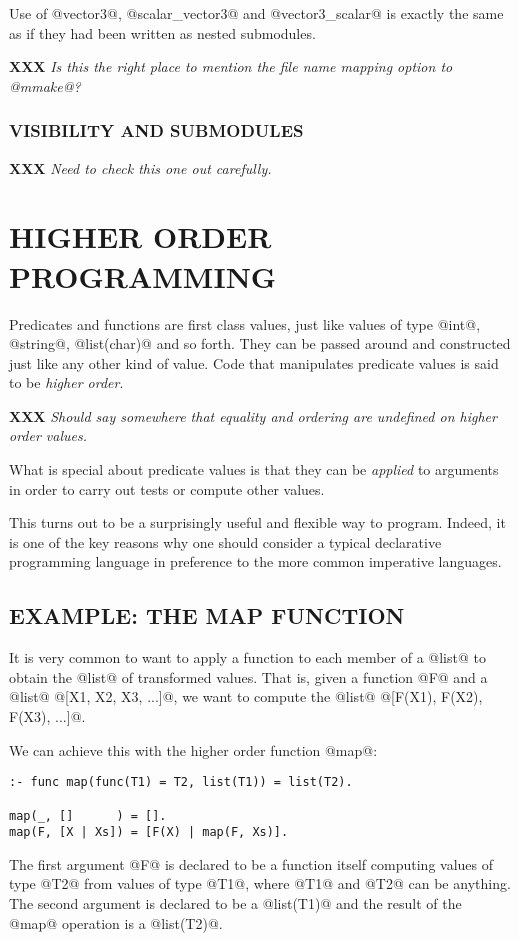 \documentclass[a4paper,11pt,notitlepage,onecolumn]{article}
\newcommand{\XXX}[1]%
{{\small\textbf{XXX} \emph{#1}}}
\begin{document}
Use of @vector3@, @scalar_vector3@ and @vector3_scalar@ is exactly the
same as if they had been written as nested submodules.

\XXX{Is this the right place to mention the file name mapping option to
@mmake@?}

\subsubsection{VISIBILITY AND SUBMODULES}

\XXX{Need to check this one out carefully.}



\section{HIGHER ORDER PROGRAMMING}

Predicates and functions are first class values, just like values of
type @int@, @string@, @list(char)@ and so forth.  They can be
passed around and constructed just like any other kind of value.  Code
that manipulates predicate values is said to be \emph{higher order}.

\XXX{Should say somewhere that equality and ordering are undefined on
higher order values.}

What is special about predicate values is that they can be
\emph{applied} to arguments in order to carry out tests or compute other
values.

This turns out to be a surprisingly useful and flexible way to program.
Indeed, it is one of the key reasons why one should consider a typical
declarative programming language in preference to the more common
imperative languages.

\subsection{EXAMPLE: THE MAP FUNCTION}

It is very common to want to apply a function to each member of a @list@
to obtain the @list@ of transformed values.  That is, given a function
@F@ and a @list@ @[X1, X2, X3, ...]@, we want to compute the @list@
@[F(X1), F(X2), F(X3), ...]@.

We can achieve this with the higher order function @map@:
\begin{verbatim}
:- func map(func(T1) = T2, list(T1)) = list(T2).

map(_, []      ) = [].
map(F, [X | Xs]) = [F(X) | map(F, Xs)].
\end{verbatim}
The first argument @F@ is declared to be a function itself computing
values of type @T2@ from values of type @T1@, where @T1@ and @T2@ can be
anything.  The second argument is declared to be a @list(T1)@ and the
result of the @map@ operation is a @list(T2)@.
\end{document}
